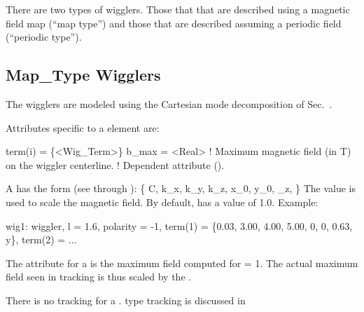 {There are two types of wigglers. Those that that are described using a
magnetic field map (``map type'') and those that are described
assuming a periodic field (``periodic type''). 

\subsection{Map\_Type Wigglers}
\label{s:wiggler.map}

The  wigglers are modeled using the Cartesian mode
decomposition of Sec.~. 

Attributes specific to a   element are:
\begin{example}
  term(i)  = \{<Wig_Term>\} 
  b_max    = <Real>   ! Maximum magnetic field (in T) on the wiggler centerline. 
                      !   Dependent attribute ().
\end{example}

A  has the form (see  through ):
\Begineq
  \{ C, k_x, k_y, k_z, x_0, y_0, \phi_z,  \}
\Endeq
The  value is used to scale the magnetic field. By
default,  has a value of 1.0.  Example:
\begin{example}
  wig1: wiggler, l = 1.6, polarity = -1, 
        term(1) = \{0.03, 3.00, 4.00, 5.00, 0, 0, 0.63, y\},
        term(2) = ...
\end{example}

The  attribute for a   is the
maximum field computed for  = 1. The actual maximum field
seen in tracking is thus scaled by the .

There is no  tracking for a 
.  type tracking is discussed in 

}
